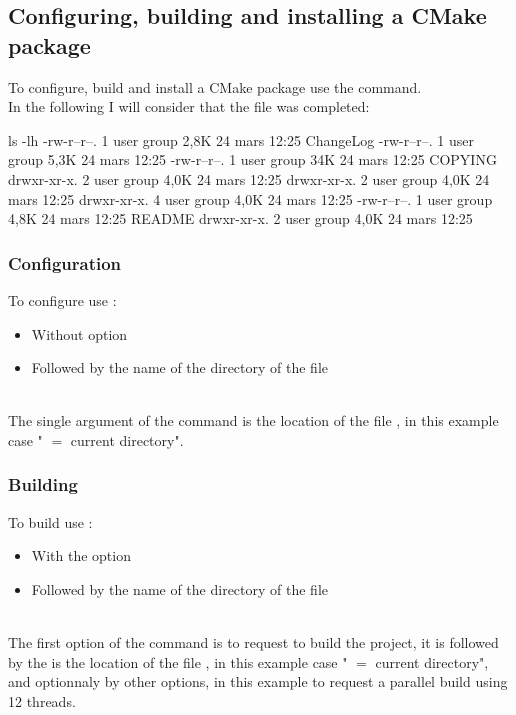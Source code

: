 \subsection{Configuring, building and installing a CMake package}

To configure, build and install a CMake package use the  command. \\
In the following I will consider that the file  was completed: 
{\footnotesize{
\begin{script}
 ls -lh
-rw-r--r--. 1 user group 2,8K 24 mars  12:25 ChangeLog
-rw-r--r--. 1 user group 5,3K 24 mars  12:25 
-rw-r--r--. 1 user group  34K 24 mars  12:25 COPYING
drwxr-xr-x. 2 user group 4,0K 24 mars  12:25 
drwxr-xr-x. 2 user group 4,0K 24 mars  12:25 
drwxr-xr-x. 4 user group 4,0K 24 mars  12:25 
-rw-r--r--. 1 user group 4,8K 24 mars  12:25 README
drwxr-xr-x. 2 user group 4,0K 24 mars  12:25 
\end{script}
}}

\subsubsection*{Configuration}

To configure use :
\begin{itemize}
\item Without option
\item Followed by the name of the directory of the  file
\end{itemize}
\vspace{-1cm}
\begin{script}
  
\end{script}
\\[-0.5cm]
\noindent The single argument of the command is the location of the file , in this example case " $=$ current directory".

\subsubsection*{Building}

To build use :
\begin{itemize}
\item With the  option
\item Followed by the name of the directory of the  file
\end{itemize}
\vspace{-1cm}
\begin{script}
	    
\end{script} 
\\[-0.5cm]
\noindent The first option of the command is to request to build the project, it is followed by the is the location of the file , in this example case " $=$ current directory", and optionnaly by other options, in this example to request a parallel build using 12 threads. 

